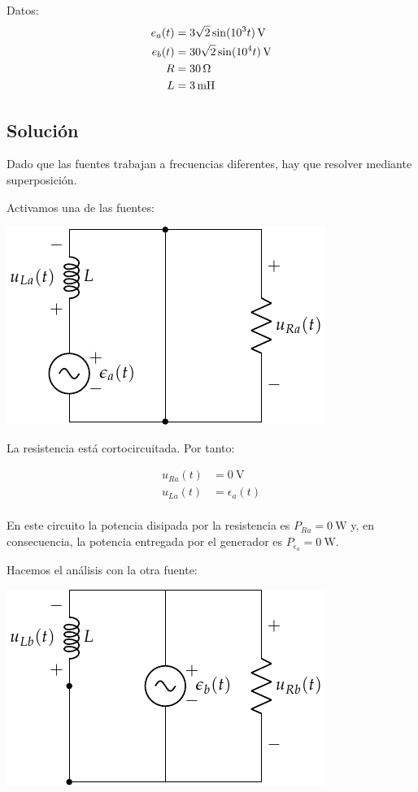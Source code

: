 \documentclass[12pt]{article}
\begin{document}
Datos:
\begin{align*}
  e_a(t) &= \SI[parse-numbers=false]{3\sqrt{2} \sin(10^3 t)}{\volt}\\
  e_b(t) &= \SI[parse-numbers=false]{30\sqrt{2} \sin(10^4 t)}{\volt}\\
  R &= \SI{30}{\ohm}\\
  L &= \SI{3}{\milli\henry}
\end{align*}


\noindent\hrulefill

\subsection*{Solución}

Dado que las fuentes trabajan a frecuencias diferentes, hay que resolver mediante superposición.

Activamos una de las fuentes:
\begin{center}
\includegraphics{figs/superposicion2_A}
\end{center}

La resistencia está cortocircuitada. Por tanto:

\begin{align*}
  u_{Ra}(t) &= \SI{0}{\volt}\\
  u_{La}(t) &= \epsilon_a(t)\\  
\end{align*}

En este circuito la potencia disipada por la resistencia es $P_{Ra} = \SI{0}{\watt}$ y, en consecuencia, la potencia entregada por el generador es $P_{\epsilon_a} = \SI{0}{\watt}$.

Hacemos el análisis con la otra fuente:

\begin{center}
\includegraphics{figs/superposicion2_B}
\end{center}
\end{document}
